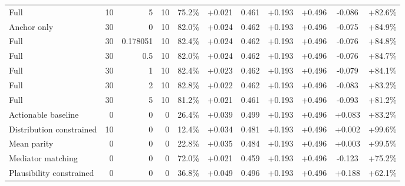 \begin{table}[htbp]
\begin{tabular}{lrrrccccccc}
Full & 10 & 5 & 10 & 75.2\% & +0.021 & 0.461 & +0.193 & +0.496 & -0.086 & +82.6\% \\
Anchor only & 30 & 0 & 10 & 82.0\% & +0.024 & 0.462 & +0.193 & +0.496 & -0.075 & +84.9\% \\
Full & 30 & 0.178051 & 10 & 82.4\% & +0.024 & 0.462 & +0.193 & +0.496 & -0.076 & +84.8\% \\
Full & 30 & 0.5 & 10 & 82.0\% & +0.024 & 0.462 & +0.193 & +0.496 & -0.076 & +84.7\% \\
Full & 30 & 1 & 10 & 82.4\% & +0.023 & 0.462 & +0.193 & +0.496 & -0.079 & +84.1\% \\
Full & 30 & 2 & 10 & 82.8\% & +0.022 & 0.462 & +0.193 & +0.496 & -0.083 & +83.2\% \\
Full & 30 & 5 & 10 & 81.2\% & +0.021 & 0.461 & +0.193 & +0.496 & -0.093 & +81.2\% \\
Actionable baseline & 0 & 0 & 0 & 26.4\% & +0.039 & 0.499 & +0.193 & +0.496 & +0.083 & +83.2\% \\
Distribution constrained & 10 & 0 & 0 & 12.4\% & +0.034 & 0.481 & +0.193 & +0.496 & +0.002 & +99.6\% \\
Mean parity & 0 & 0 & 0 & 22.8\% & +0.035 & 0.484 & +0.193 & +0.496 & +0.003 & +99.5\% \\
Mediator matching & 0 & 0 & 0 & 72.0\% & +0.021 & 0.459 & +0.193 & +0.496 & -0.123 & +75.2\% \\
Plausibility constrained & 0 & 0 & 0 & 36.8\% & +0.049 & 0.496 & +0.193 & +0.496 & +0.188 & +62.1\% \\
\bottomrule
\end{tabular}
\end{table}
